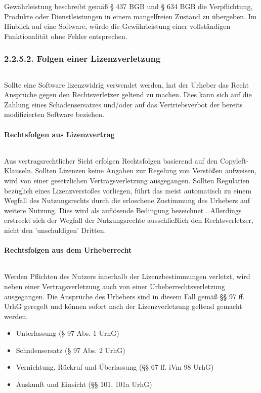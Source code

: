 Gewährleistung beschreibt gemäß § 437 BGB und § 634 BGB die Verpflichtung, Produkte oder Dienstleistungen in einem mangelfreien Zustand zu übergeben. Im Hinblick auf eine Software, würde die Gewährleistung einer vollständigen Funktionalität ohne Fehler entsprechen. 

\subsubsection{2.2.5.2. Folgen einer Lizenzverletzung}$~$

Sollte eine Software lizenzwidrig verwendet werden, hat der Urheber das Recht Ansprüche gegen den Rechtsverletzer geltend zu machen. Dies kann sich auf die Zahlung eines Schadensersatzes und/oder auf das Vertriebsverbot der bereits modifizierten Software beziehen.

\paragraph{Rechtsfolgen aus Lizenzvertrag}$~$

Aus vertragsrechtlicher Sicht erfolgen Rechtsfolgen basierend auf den Copyleft-Klauseln. Sollten Lizenzen keine Angaben zur Regelung von Verstößen aufweisen, wird von einer gesetzlichen Vertragsverletzung ausgegangen. Sollten Regularien bezüglich eines Lizenzverstoßes vorliegen, führt das meist automatisch zu einem Wegfall des Nutzungsrechts durch die erloschene Zustimmung des Urhebers auf weitere Nutzung. Dies wird als auflösende Bedingung bezeichnet \cite[S. 68]{bitkom_open_2016}.  Allerdings erstreckt sich der Wegfall der Nutzungsrechte ausschließlich den Rechtsverletzer, nicht den 'unschuldigen' Dritten.

\paragraph{Rechtsfolgen aus dem Urheberrecht}$~$

Werden Pflichten des Nutzers innerhalb der Lizenzbestimmungen verletzt, wird neben einer Vertragsverletzung auch von einer Urheberrechtsverletzung ausgegangen. Die Ansprüche des Urhebers sind in diesem Fall gemäß §§ 97 ff. UrhG geregelt und können sofort nach der Lizenzverletzung geltend gemacht werden. 

\begin{itemize}
    \item Unterlassung (§ 97 Abs. 1 UrhG)
    \item Schadensersatz (§ 97 Abs. 2 UrhG)
    \item Vernichtung, Rückruf und Überlassung (§§ 67 ff. iVm 98 UrhG)
    \item Auskunft und Einsicht (§§ 101, 101a UrhG)
\end{itemize}

